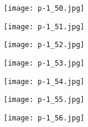 \clearpage


\begin{figure}
    \begin{center}
        \texttt{[image: p-1\_50.jpg]}
        \caption{}
    \end{center}
\end{figure}

\clearpage


\begin{figure}
    \begin{center}
        \texttt{[image: p-1\_51.jpg]}
        \caption{}
    \end{center}
\end{figure}

\clearpage


\begin{figure}
    \begin{center}
        \texttt{[image: p-1\_52.jpg]}
        \caption{}
    \end{center}
\end{figure}

\clearpage


\begin{figure}
    \begin{center}
        \texttt{[image: p-1\_53.jpg]}
        \caption{}
    \end{center}
\end{figure}

\clearpage


\begin{figure}
    \begin{center}
        \texttt{[image: p-1\_54.jpg]}
        \caption{}
    \end{center}
\end{figure}

\clearpage


\begin{figure}
    \begin{center}
        \texttt{[image: p-1\_55.jpg]}
        \caption{}
    \end{center}
\end{figure}

\clearpage


\begin{figure}
    \begin{center}
        \texttt{[image: p-1\_56.jpg]}
        \caption{}
    \end{center}
\end{figure}

